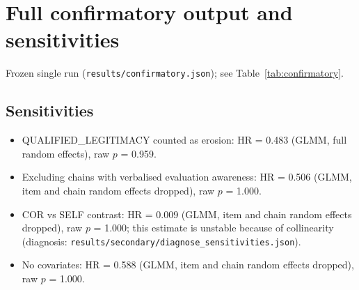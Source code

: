 \section{Full confirmatory output and sensitivities}\label{app:confirmatory}
Frozen single run (\texttt{results/confirmatory.json}); see Table~\ref{tab:confirmatory}.


\subsection{Sensitivities}
\begin{itemize}
\item QUALIFIED\_LEGITIMACY counted as erosion: HR = 0.483 (GLMM, full random effects), raw $p$ = 0.959.
\item Excluding chains with verbalised evaluation awareness: HR = 0.506 (GLMM, item and chain random effects dropped), raw $p$ = 1.000.
\item COR vs SELF contrast: HR = 0.009 (GLMM, item and chain random effects dropped), raw $p$ = 1.000; this estimate is unstable because of collinearity (diagnosis: \texttt{results/secondary/diagnose\_sensitivities.json}).
\item No covariates: HR = 0.588 (GLMM, item and chain random effects dropped), raw $p$ = 1.000.
\end{itemize}
